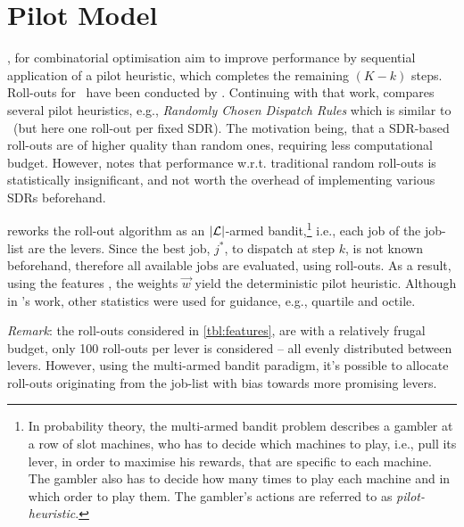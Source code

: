 
\chapter{Pilot Model}\label{ch:rollout}

\citep{Bertsekas97,Duin99}, for combinatorial optimisation aim to improve 
performance by sequential application of a pilot heuristic, which completes the 
remaining $(K-k)$ steps. Roll-outs for \JSP\ have been conducted by 
\citet{Ru12}. 
Continuing with that work, \citet{Geirsson2012} compares several pilot 
heuristics, e.g., \emph{Randomly Chosen Dispatch Rules} which is similar 
to \phiSDRRelated\ (but here one roll-out per fixed SDR). 
The motivation being, that a SDR-based roll-outs are of higher quality than 
random ones, requiring less computational budget. 
However, \citeauthor{Geirsson2012} notes that performance w.r.t. traditional 
random roll-outs is statistically insignificant, and not worth the overhead of 
implementing various SDRs beforehand. 

\citeauthor{Geirsson2012} reworks the roll-out algorithm as an 
$\lvert\mathcal{L}\rvert$-armed bandit,\footnote{In probability theory, the
    multi-armed bandit problem \citep{badit:book} describes a gambler at a row 
    of slot machines, who has to decide which machines to play, i.e., pull its 
    lever, in  order to maximise his rewards, that are specific to each 
    machine. The gambler also has to decide how many times to play each machine 
    and in which order to play them. The gambler's actions are referred to as 
    \emph{pilot-heuristic}.} 
i.e., each job of the job-list are the levers. Since the best job, $j^*$, to 
dispatch at step $k$, is not known beforehand, therefore all available jobs are 
evaluated, using roll-outs. 
As a result, using the features \phiRNDRelated, the weights $\vec{w}$ yield the 
deterministic pilot heuristic. Although in \citeauthor{Geirsson2012}'s work, 
other statistics were used for guidance, e.g., quartile and octile. 

\pagebreak
\emph{Remark}: the roll-outs considered in \cref{tbl:features}, are with a 
relatively frugal budget, only 100 roll-outs per lever is considered -- all 
evenly distributed between levers. 
However, using the multi-armed bandit paradigm, it's possible to allocate 
roll-outs originating from the job-list with bias towards more promising levers.


